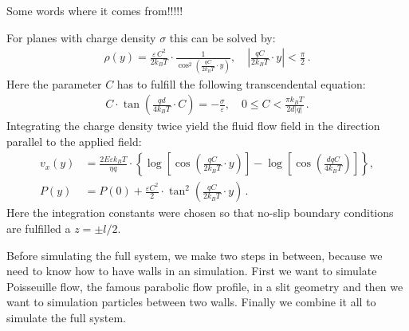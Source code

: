 Some words where it comes from!!!!!

For planes with charge density $\sigma$ this can be solved by:
\begin{align*}
		\rho(y)=\frac{\varepsilon\,C^2}{2 k_B T}\cdot\frac 1 {\cos^2\left(\frac{qC}{2k_B T}\cdot y\right)},\quad \left|\frac{qC}{2k_B T}\cdot y\right|<\frac\pi 2\,.
	\end{align*}
Here the parameter $C$ has to fulfill the following transcendental
equation:
	\begin{align*}
		C\cdot\tan\left(\frac{qd}{4k_B T}\cdot C\right)=-\frac\sigma\varepsilon,\quad 0\le C<\frac{\pi k_B T}{2d|q|}\,.
	\end{align*}
Integrating the charge density twice yield the fluid flow field
in the direction parallel to the applied field:
	\begin{align*}
		v_x(y)&=\frac{2E\varepsilon k_B T}{\eta q}\cdot\left\{\log\left[\cos\left(\frac{qC}{2k_B T}\cdot y\right)\right]-\log\left[\cos\left(\frac{dqC}{4k_B T}\right)\right]\right\},\\
		P(y)&=P(0)+\frac{\varepsilon C^2}2\cdot\tan^2\left(\frac{qC}{2 k_B T}\cdot y\right)\,.
	\end{align*}
Here the integration constants were chosen so that no-slip boundary
conditions are fulfilled a $z = \pm l/2$.

Before simulating the full system, we make two steps in between, because
we need to know how to have walls in an \ES{} simulation. First we want
to simulate Poisseuille flow, the famous parabolic flow profile, in a slit
geometry and then we want to simulation particles between two walls. Finally
we combine it all to simulate the full system.
